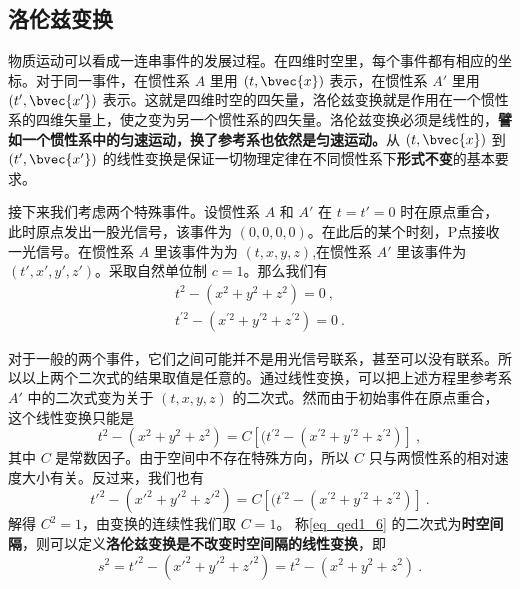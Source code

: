 
\begin{issues}
\issueTODO
\end{issues}


\subsection{洛伦兹变换}
物质运动可以看成一连串事件的发展过程。在四维时空里，每个事件都有相应的坐标。对于同一事件，在惯性系 $A$ 里用 $(t, \bvec{x})$ 表示，在惯性系 $A'$ 里用 $(t', \bvec{x'})$ 表示。这就是四维时空的四矢量，洛伦兹变换就是作用在一个惯性系的四维矢量上，使之变为另一个惯性系的四矢量。洛伦兹变换必须是线性的，\textbf{譬如一个惯性系中的匀速运动，换了参考系也依然是匀速运动。}从 $(t, \bvec{x})$ 到 $(t', \bvec{x'})$ 的线性变换是保证一切物理定律在不同惯性系下\textbf{形式不变}的基本要求。

接下来我们考虑两个特殊事件。设惯性系 $A$ 和 $A'$ 在 $t=t'=0$ 时在原点重合，此时原点发出一股光信号，该事件为 $(0,0,0,0)$。在此后的某个时刻，P点接收一光信号。在惯性系 $A$ 里该事件为为 $(t,x,y,z)$,在惯性系 $A'$ 里该事件为 $(t',x',y',z')$。采取自然单位制 $c=1$。那么我们有
\begin{equation}\label{eq_qed1_6}
\begin{array}{c}
t^{2}-(x^{2}+y^{2}+z^{2})=0~,\\
t^{\prime 2}-(x^{\prime 2}+y^{\prime 2}+z^{\prime 2})=0~.
\end{array}
\end{equation}

对于一般的两个事件，它们之间可能并不是用光信号联系，甚至可以没有联系。所以以上两个二次式的结果取值是任意的。通过线性变换，可以把上述方程里参考系 $A'$ 中的二次式变为关于 $(t,x,y,z)$ 的二次式。然而由于初始事件在原点重合，这个线性变换只能是
\begin{equation}
t^{2}-(x^{2}+y^{2}+z^{2})=C\left[(t^{\prime 2}-(x^{\prime 2}+y^{\prime 2}+z^{\prime 2})\right]~,
\end{equation}
其中 $C$ 是常数因子。由于空间中不存在特殊方向，所以 $C$ 只与两惯性系的相对速度大小有关。反过来，我们也有
\begin{equation}
t'^{2}-(x'^{2}+y'^{2}+z'^{2})=C\left[(t^{\prime 2}-(x^{\prime 2}+y^{\prime 2}+z^{\prime 2})\right]~.
\end{equation}
解得 $C^2=1$，由变换的连续性我们取 $C=1$。
称\autoref{eq_qed1_6} 的二次式为\textbf{时空间隔}，则可以定义\textbf{洛伦兹变换是不改变时空间隔的线性变换}，即
\begin{equation}\label{eq_qed1_7}
s^2=t'^{2}-(x'^{2}+y'^{2}+z'^{2})=t^{2}-(x^{2}+y^{2}+z^{2})~.
\end{equation}

